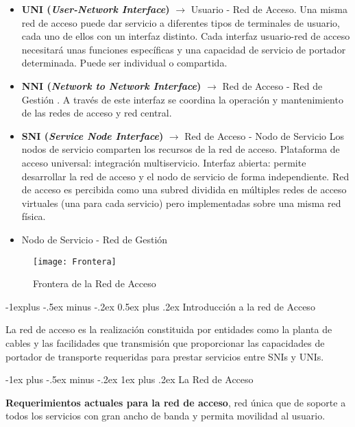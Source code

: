 \documentclass[10pt,portrait, twocolumn]{article}
\makeatletter
\renewcommand{\subsection}{\@startsection{subsection}{2}{0mm}%
                                {-1explus -.5ex minus -.2ex}%
                                {0.5ex plus .2ex}%
                                {\normalfont\normalsize\bfseries}}
\renewcommand{\subsubsection}{\@startsection{subsubsection}{3}{0mm}%
                                {-1ex plus -.5ex minus -.2ex}%
                                {1ex plus .2ex}%
                                {\normalfont\small\bfseries}}
\makeatother
\begin{document}
	\begin{itemize}
		\item \textbf{UNI (\textit{User-Network Interface})} $\rightarrow$ Usuario - Red de Acceso. Una misma red de acceso puede dar servicio a diferentes tipos de terminales de usuario, cada uno de ellos con un interfaz distinto. Cada interfaz usuario-red de acceso necesitará unas funciones específicas y una capacidad de servicio de portador determinada. Puede ser individual o compartida.
		\item \textbf{NNI (\textit{Network to Network Interface})} $\rightarrow$ Red de Acceso - Red de Gestión . A través de este interfaz se coordina la operación y mantenimiento de las redes de acceso y red central.
		\item \textbf{SNI (\textit{Service Node Interface})} $\rightarrow$ Red de Acceso - Nodo de Servicio   Los nodos de servicio comparten los recursos de la red de acceso. Plataforma de acceso universal: integración multiservicio. Interfaz abierta: permite desarrollar la red de acceso y el nodo de servicio de forma independiente. Red de acceso es percibida como una subred dividida en múltiples redes de acceso virtuales (una para cada servicio) pero implementadas sobre una misma red física.
		\item Nodo de Servicio - Red de Gestión
	\end{itemize}

\begin{figure}[!ht]
	\centering
     \texttt{[image: Frontera]}
      \caption{Frontera de la Red de Acceso}
      \label{fig:ONT}
  \end{figure}

\subsection{Introducción a la red de Acceso}

La red de acceso es la realización constituida por entidades como la planta de cables y las facilidades que transmisión que proporcionar las capacidades de portador de transporte requeridas para prestar servicios entre SNIs y UNIs.

\subsubsection{La Red de Acceso}

\textbf{Requerimientos actuales para la red de acceso}, red única que de soporte a todos los servicios con gran ancho de banda y permita movilidad al usuario.
\end{document}

